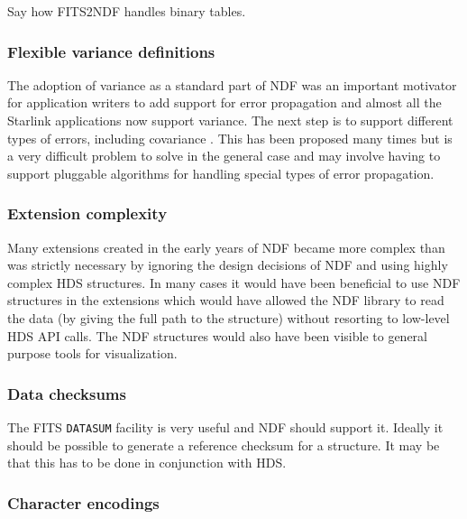\documentclass[final,authoryear,5p,times,twocolumn]{elsarticle}
\begin{document}
{\color{red} Say how FITS2NDF handles binary tables.}

\subsubsection{Flexible variance definitions}

The adoption of variance as a standard part of NDF was an important
motivator for application writers to add support for error propagation and
almost all the Starlink applications now support variance. The next
step is to support different types of errors, including
covariance \citep[see e.g.][]{1992ESOC...41...47M}. This has been proposed many times \citep[see
e.g.][]{1991STARB...8...19M} but is a very difficult problem to solve
in the general case and may involve having to support pluggable
algorithms for handling special types of error propagation.

\subsubsection{Extension complexity}

Many extensions created in the early years of NDF became more complex
than was strictly necessary by ignoring the design decisions of NDF and
using highly complex HDS structures. In many cases it would have been
beneficial to use NDF structures in the extensions which would have
allowed the NDF library to read the data (by giving the full path to
the structure) without resorting to low-level HDS API calls. The NDF
structures would also have been visible to general purpose tools for
visualization.

\subsubsection{Data checksums}

The FITS \texttt{DATASUM} facility \citep{2012arXiv1201.1345S} is very useful and NDF should support
it. Ideally it should be possible to generate a reference checksum for
a structure. It may be that this has to be done in conjunction with
HDS.

\subsubsection{Character encodings}
\end{document}
